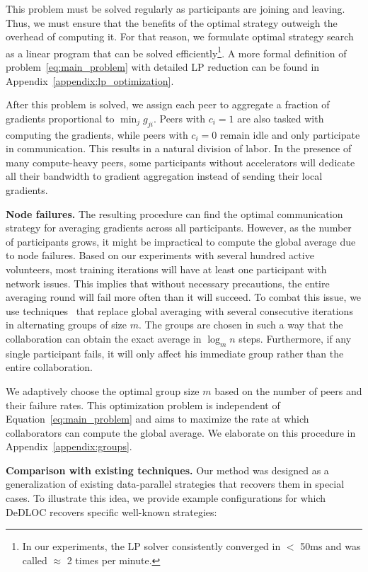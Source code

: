 This problem must be solved regularly as participants are joining and leaving. Thus, we must ensure that the benefits of the optimal strategy outweigh the overhead of computing it. For that reason, we formulate optimal strategy search as a linear program that can be solved efficiently\footnote{In our experiments, the LP solver consistently converged in  $<$ 50ms and was called $\approx$ 2 times per minute.}. A more formal definition of problem~\eqref{eq:main_problem} with detailed LP reduction can be found in Appendix~\ref{appendix:lp_optimization}.

After this problem is solved, we assign each peer to aggregate a fraction of gradients proportional to $\min_j g_{ji}$. Peers with $c_i{=}1$ are also tasked with computing the gradients, while peers with $c_i{=}0$ remain idle and only participate in communication. This results in a natural division of labor. In the presence of many compute-heavy peers, some participants without accelerators will dedicate all their bandwidth to gradient aggregation instead of sending their local gradients.

\textbf{Node failures.} The resulting procedure can find the optimal communication strategy for averaging gradients across all participants. However, as the number of participants grows, it might be impractical to compute the global average due to node failures. Based on our experiments with several hundred active volunteers, most training iterations will have at least one participant with network issues. This implies that without necessary precautions, the entire averaging round will fail more often than it will succeed. %
To combat this issue, we use techniques~\cite{moshpit,wagma} that replace global averaging with several consecutive iterations in alternating groups of size $m$. The groups are chosen in such a way that the collaboration can obtain the exact average in $\log_m n$ steps. Furthermore, if any single participant fails, it will only affect his immediate group rather than the entire collaboration.

We adaptively choose the optimal group size $m$ based on the number of peers and their failure rates. This optimization problem is independent of Equation~\eqref{eq:main_problem} and aims to maximize the rate at which collaborators can compute the global average. We elaborate on this procedure in Appendix~\ref{appendix:groups}.

\textbf{Comparison with existing techniques.} Our method was designed as a generalization of existing data-parallel strategies that recovers them in special cases. To illustrate this idea, we provide example configurations for which DeDLOC recovers specific well-known strategies:


